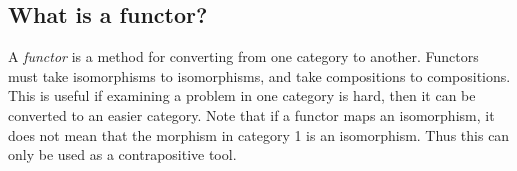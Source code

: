 \documentclass[12pt]{armath}
\begin{document}
  \subsection{What is a functor?}%
  \label{sub:what_is_a_functor_}

  A \textit{functor} is a method for converting from one category to another.
  Functors must take isomorphisms to isomorphisms, and take compositions to
  compositions. This is useful if examining a problem in one category is hard,
  then it can be converted to an easier category. Note that if a functor maps an
  isomorphism, it does not mean that the morphism in category 1 is an
  isomorphism. Thus this can only be used as a contrapositive tool.


      
\end{document}
